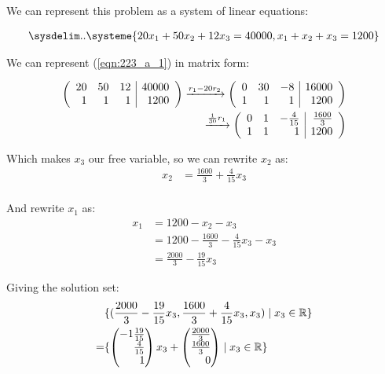 \documentclass[12pt]{article}
\newenvironment{abc}{\begin{enumerate}[label={\bf(\alph*)}]}{\end{enumerate}}
\newcommand\m[2][]{
	\ifthenelse{\equal {#1} {}}
		{\begin{pmatrix*}[r]#2\end{pmatrix*}}
		{\left(\begin{array}{#1}#2\end{array}\right)}
}
\newcommand\resetequation[1][1]{\setcounter{equation}{#1 - 1}}
\begin{document}
\begin{abc}
	\begin{item}
	\resetequation
	We can represent this problem as a system of linear equations:

	\begin{equation}\label{eqn:223_a_1}
	\begin{aligned}
		\sysdelim..\systeme{20x_1 + 50x_2 + 12x_3 = 40000, x_1 + x_2 + x_3 = 1200}
	\end{aligned}
	\end{equation}
	\end{item}

	\begin{item}\label{subproblem:223_1_b}
	We can represent (\ref{eqn:223_a_1}) in matrix form:

	\begin{equation}
	\begin{aligned}
		\m[rrr|r]{20 & 50 & 12 & 40000 \\ 1 & 1 & 1 & 1200}
		\xrightarrow{r_1 - 20r_2}
		\m[rrr|r]{0 & 30 & -8 & 16000 \\ 1 & 1 & 1 & 1200}
		\\
		\xrightarrow{\frac{1}{30}r_1}
		\m[rrr|r]{0 & 1 & -\frac{4}{15} & \frac{1600}{3} \\ 1 & 1 & 1 & 1200}
	\end{aligned}
	\end{equation}

	Which makes $x_3$ our free variable, so we can rewrite $x_2$ as:
	\begin{equation}
	\begin{aligned}
		x_2 &= \frac{1600}{3} + \frac{4}{15}x_3 \\
	\end{aligned}
	\end{equation}

	And rewrite $x_1$ as:
	\begin{equation}
	\begin{aligned}
		x_1 &= 1200 -x_2 - x_3 \\
		    &= 1200 - \frac{1600}{3} - \frac{4}{15}x_3 - x_3 \\
		    &= \frac{2000}{3} - \frac{19}{15}x_3
	\end{aligned}
	\end{equation}

	Giving the solution set:
	\begin{equation}
	\begin{aligned}
		&\{(\frac{2000}{3} - \frac{19}{15}x_3, \frac{1600}{3} + \frac{4}{15}x_3, x_3) \mid x_3 \in \mathbb{R} \} \\
		= &\{ \m{- 1\frac{19}{15} \\ \frac{4}{15} \\ 1}x_3 + \m{\frac{2000}{3} \\ \frac{1600}{3} \\ 0} \mid x_3 \in \mathbb{R} \}
	\end{aligned}
	\end{equation}


\end{item}
\end{abc}
\end{document}
